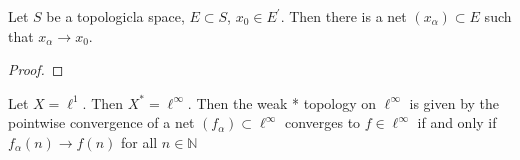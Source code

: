 \begin{example}
  Let $S$ be a topologicla space, $E \subset S$, $x_0 \in E^\prime$. Then there is a net $(x_\alpha) \subset E$ such that $x_\alpha \to x_0$.
\end{example}
\begin{proof}
  
\end{proof}

 \begin{example}
   Let $X = \ell^{1}$. Then $X^{*} = \ell^{\infty}$. Then the weak * topology on $\ell^{\infty}$ is given by the pointwise convergence of a net $(f_\alpha) \subset \ell^{\infty}$ converges to $f \in \ell^{\infty}$ if and only if $f_\alpha(n) \to f(n)$ for all $ n \in \mathbb{N}$
 \end{example}
